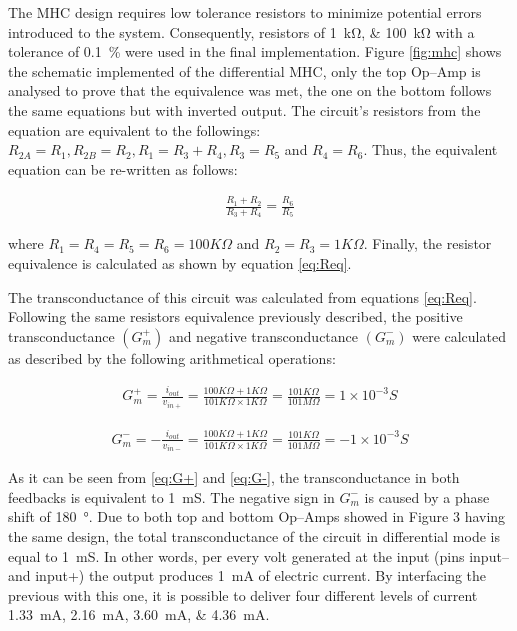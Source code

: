 The MHC design requires low tolerance resistors to minimize potential errors introduced to the system. Consequently, resistors of \SIlist{1;100}{\kohm} with a tolerance of \SI{0.1}{\percent} were used in the final implementation. Figure \ref{fig:mhc} shows the schematic implemented of the differential MHC, only the top Op–Amp is analysed to prove that the equivalence was met, the one on the bottom follows the same equations but with inverted output. The circuit’s resistors from the equation are equivalent to the followings: $R_{2A}=R_1, R_{2B}=R_2, R_1 = R_3 + R_4, R_3 = R_5$ and $R_4 = R_6$. Thus, the equivalent equation can be re-written as follows: 

\begin{align}
\label{eq:Req}
\frac{R_1 + R_2}{R_3 + R_4} = \frac{R_6}{R_5}
\end{align}

where $R_1=R_4=R_5=R_6=100K\Omega$ and $R_2=R_3=1K\Omega$. Finally, the resistor equivalence is calculated as shown by equation \ref{eq:Req}. 

The transconductance of this circuit was calculated from equations \ref{eq:Req}. Following the same resistors equivalence previously described, the positive  transconductance $(G^+_m)$ and negative transconductance $(G^-_m)$ were calculated as described by the following arithmetical operations:


\begin{align}
\label{eq:G+}
G^+_m=\frac{i_{out}}{v_{in+}}=\frac{100K\Omega + 1K\Omega}{101K\Omega \times 1K\Omega}=\frac{101K\Omega}{101M\Omega}=1\times10^{-3}S 
\end{align}

\begin{align}
\label{eq:G-}
G^-_m=-\frac{i_{out}}{v_{in-}}=\frac{100K\Omega + 1K\Omega}{101K\Omega \times 1K\Omega}=\frac{101K\Omega}{101M\Omega}=-1\times10^{-3}S 
\end{align}

As it can be seen from \ref{eq:G+} and \ref{eq:G-}, the transconductance in both feedbacks is equivalent to \SI{1}{\milli\siemens}. The negative sign in $G^{-}_m$ is caused by a phase shift of \SI{180}{\degree}. Due to both top and bottom Op–Amps showed in Figure 3 having the same design, the total transconductance of the circuit in differential mode is equal to \SI{1}{\milli\siemens}. In other words, per every volt generated at the input (pins input– and input+) the output produces \SI{1}{\mA} of electric current. By interfacing the previous with this one, it is possible to deliver four different levels of current \SIlist{1.33;2.16;3.60;4.36}{\mA}.

